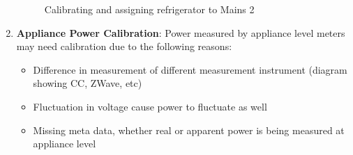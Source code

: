 \documentclass[conference]{IEEEtran}
\begin{document}
\begin{enumerate}
\begin{figure}
  	\caption{Calibrating and assigning refrigerator to Mains 2 }
    \label{fig:assignment}
\end{figure}

\item \textbf{Appliance Power Calibration}: 
Power measured by appliance level meters may need calibration due to the following reasons:
\begin{itemize}
\item Difference in measurement of different measurement instrument (diagram showing CC, ZWave, etc)
\item Fluctuation in voltage cause power to fluctuate as well
\item Missing meta data, whether real or apparent power is being measured at appliance level


\end{itemize}
\end{enumerate}
\end{document}
